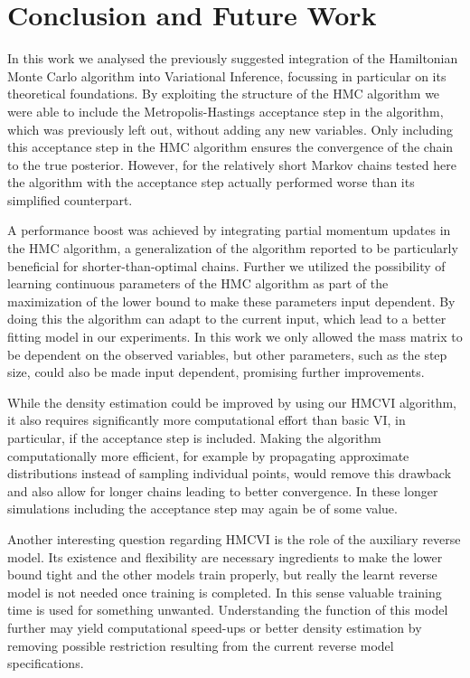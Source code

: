 \section{Conclusion and Future Work}
\label{sec:ConclAndFuture}
In this work we analysed the previously suggested integration of the Hamiltonian Monte Carlo algorithm into Variational Inference, focussing in particular on its theoretical foundations. By exploiting the structure of the HMC algorithm we were able to include the Metropolis-Hastings acceptance step in the algorithm, which was previously left out, without adding any new variables. Only including this acceptance step in the HMC algorithm ensures the convergence of the chain to the true posterior. However, for the relatively short Markov chains tested here the algorithm with the acceptance step actually performed worse than its simplified counterpart.

A performance boost was achieved by integrating partial momentum updates in the HMC algorithm, a generalization of the algorithm reported to be particularly beneficial for shorter-than-optimal chains. Further we utilized the possibility of learning continuous parameters of the HMC algorithm as part of the maximization of the lower bound to make these parameters input dependent. By doing this the algorithm can adapt to the current input, which lead to a better fitting model in our experiments. In this work we only allowed the mass matrix to be dependent on the observed variables, but other parameters, such as the step size, could also be made input dependent, promising further improvements.

While the density estimation could be improved by using our HMCVI algorithm, it also requires significantly more computational effort than basic VI, in particular, if the acceptance step is included. Making the algorithm computationally more efficient, for example by propagating approximate distributions instead of sampling individual points, would remove this drawback and also allow for longer chains leading to better convergence. In these longer simulations including the acceptance step may again be of some value.

Another interesting question regarding HMCVI is the role of the auxiliary reverse model. Its existence and flexibility are necessary ingredients to make the lower bound tight and the other models train properly, but really the learnt reverse model is not needed once training is completed. In this sense valuable training time is used for something unwanted. Understanding the function of this model further may yield computational speed-ups or better density estimation by removing possible restriction resulting from the current reverse model specifications.